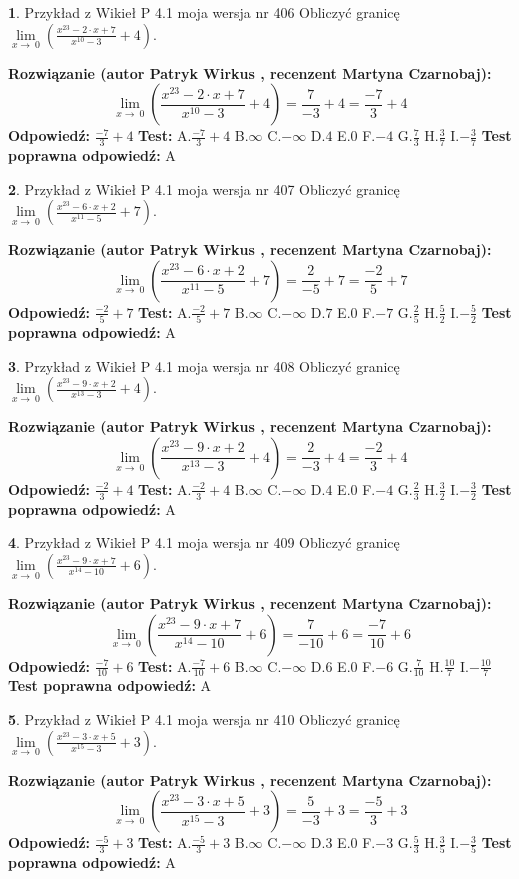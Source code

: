 \documentclass[12pt, a4paper]{article}
\theoremstyle{definition} %
\newtheorem{zad}{}
\newcommand{\zadStart}[1]{\begin{zad}#1\newline}
\newcommand{\zadStop}{\end{zad}}
\newcommand{\rozwStart}[2]{\noindent \textbf{Rozwiązanie (autor #1 , recenzent #2): }\newline}
\newcommand{\rozwStop}{\newline}
\newcommand{\odpStart}{\noindent \textbf{Odpowiedź:}\newline}
\newcommand{\odpStop}{\newline}
\newcommand{\testStart}{\noindent \textbf{Test:}\newline}
\newcommand{\testStop}{\newline}
\newcommand{\kluczStart}{\noindent \textbf{Test poprawna odpowiedź:}\newline}
\newcommand{\kluczStop}{\newline}
\begin{document}
\zadStart{Przykład z Wikieł P 4.1 moja wersja nr 406}
Obliczyć granicę $\lim\limits_{x\to\ 0}(\frac{x^{23}-2 \cdot x +7}{x^{10}-3}+4)$.
\zadStop
\rozwStart{Patryk Wirkus}{Martyna Czarnobaj}
$$\lim\limits_{x\to\ 0}(\frac{x^{23}-2 \cdot x +7}{x^{10}-3}+4)=\frac{7}{-3}+4=\frac{-7}{3}+4$$
\rozwStop
\odpStart
$\frac{-7}{3}+4$
\odpStop
\testStart
A.$\frac{-7}{3}+4$
B.$\infty$
C.$-\infty$
D.$4$
E.$0$
F.$-4$
G.$\frac{7}{3}$
H.$\frac{3}{7}$
I.$-\frac{3}{7}$
\testStop
\kluczStart
A
\kluczStop



\zadStart{Przykład z Wikieł P 4.1 moja wersja nr 407}
Obliczyć granicę $\lim\limits_{x\to\ 0}(\frac{x^{23}-6 \cdot x +2}{x^{11}-5}+7)$.
\zadStop
\rozwStart{Patryk Wirkus}{Martyna Czarnobaj}
$$\lim\limits_{x\to\ 0}(\frac{x^{23}-6 \cdot x +2}{x^{11}-5}+7)=\frac{2}{-5}+7=\frac{-2}{5}+7$$
\rozwStop
\odpStart
$\frac{-2}{5}+7$
\odpStop
\testStart
A.$\frac{-2}{5}+7$
B.$\infty$
C.$-\infty$
D.$7$
E.$0$
F.$-7$
G.$\frac{2}{5}$
H.$\frac{5}{2}$
I.$-\frac{5}{2}$
\testStop
\kluczStart
A
\kluczStop



\zadStart{Przykład z Wikieł P 4.1 moja wersja nr 408}
Obliczyć granicę $\lim\limits_{x\to\ 0}(\frac{x^{23}-9 \cdot x +2}{x^{13}-3}+4)$.
\zadStop
\rozwStart{Patryk Wirkus}{Martyna Czarnobaj}
$$\lim\limits_{x\to\ 0}(\frac{x^{23}-9 \cdot x +2}{x^{13}-3}+4)=\frac{2}{-3}+4=\frac{-2}{3}+4$$
\rozwStop
\odpStart
$\frac{-2}{3}+4$
\odpStop
\testStart
A.$\frac{-2}{3}+4$
B.$\infty$
C.$-\infty$
D.$4$
E.$0$
F.$-4$
G.$\frac{2}{3}$
H.$\frac{3}{2}$
I.$-\frac{3}{2}$
\testStop
\kluczStart
A
\kluczStop



\zadStart{Przykład z Wikieł P 4.1 moja wersja nr 409}
Obliczyć granicę $\lim\limits_{x\to\ 0}(\frac{x^{23}-9 \cdot x +7}{x^{14}-10}+6)$.
\zadStop
\rozwStart{Patryk Wirkus}{Martyna Czarnobaj}
$$\lim\limits_{x\to\ 0}(\frac{x^{23}-9 \cdot x +7}{x^{14}-10}+6)=\frac{7}{-10}+6=\frac{-7}{10}+6$$
\rozwStop
\odpStart
$\frac{-7}{10}+6$
\odpStop
\testStart
A.$\frac{-7}{10}+6$
B.$\infty$
C.$-\infty$
D.$6$
E.$0$
F.$-6$
G.$\frac{7}{10}$
H.$\frac{10}{7}$
I.$-\frac{10}{7}$
\testStop
\kluczStart
A
\kluczStop



\zadStart{Przykład z Wikieł P 4.1 moja wersja nr 410}
Obliczyć granicę $\lim\limits_{x\to\ 0}(\frac{x^{23}-3 \cdot x +5}{x^{15}-3}+3)$.
\zadStop
\rozwStart{Patryk Wirkus}{Martyna Czarnobaj}
$$\lim\limits_{x\to\ 0}(\frac{x^{23}-3 \cdot x +5}{x^{15}-3}+3)=\frac{5}{-3}+3=\frac{-5}{3}+3$$
\rozwStop
\odpStart
$\frac{-5}{3}+3$
\odpStop
\testStart
A.$\frac{-5}{3}+3$
B.$\infty$
C.$-\infty$
D.$3$
E.$0$
F.$-3$
G.$\frac{5}{3}$
H.$\frac{3}{5}$
I.$-\frac{3}{5}$
\testStop
\kluczStart
A
\kluczStop
\end{document}
